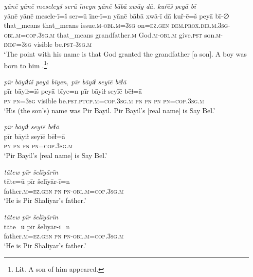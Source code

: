 \ea \label{BP.3}
\textit{yānē yānē meseleyš serū īneyn yānē bābā xwāy dā, kuřēš peyā bī} \\ 
\gll yānē yānē mesele-ī=š ser=ū īne-ī=n yānē bābā xwā-ī dā kuř-ē=š peyā bī-∅ \\ 
 that\_means that\_means issue\textsc{.m}\textsc{-obl}\textsc{.m}\textsc{=3sg} on\textsc{=ez.gen} \textsc{dem.prox}\textsc{.dir}\textsc{.m}\textsc{.3sg}\textsc{-obl}\textsc{.m}\textsc{=cop}\textsc{.3sg}\textsc{.m} that\_means grandfather\textsc{.m} God\textsc{.m}\textsc{-obl}\textsc{.m} give\textsc{.pst} son\textsc{.m}\textsc{-indf}\textsc{=3sg} visible be\textsc{.pst}\textsc{-3sg}\textsc{.m} \\ 
\glt `The point with his name is that God granted the grandfather [a son]. A boy  was born to him .\footnote{Lit. A son of him appeared.}'
\z 
 
\ea \label{BP.5}
\textit{pīr bāyiɫiš peyā bīyen, pīr bāyiɫ seyīē bēɫā} \\ 
\gll pīr bāyiɫ=iš peyā bīye=n pīr bāyiɫ seyīē bēɫ=ā \\ 
 \textsc{pn} \textsc{pn}\textsc{=3sg} visible be\textsc{.pst}\textsc{.ptcp}\textsc{.m}\textsc{=cop}\textsc{.3sg}\textsc{.m} \textsc{pn} \textsc{pn} \textsc{pn} \textsc{pn}\textsc{=cop}\textsc{.3sg}\textsc{.m} \\ 
\glt `His (the son’s) name was Pir Bayil. Pir Bayil’s [real name] is Say Bel.'
\z 
 
\ea \label{BP.6}
\textit{pīr bāyiɫ seyīē bēɫā} \\ 
\gll pīr bāyiɫ seyīē bēɫ=ā \\ 
 \textsc{pn} \textsc{pn} \textsc{pn} \textsc{pn}\textsc{=cop}\textsc{.3sg}\textsc{.m} \\ 
\glt `Pir Bayil’s [real name] is Say Bel.'
\z 
 
\ea \label{BP.7}
\textit{tātew pīr šelīyārīn} \\ 
\gll tāte=ū pīr šelīyār-ī=n \\ 
 father\textsc{.m}\textsc{=ez.gen} \textsc{pn} \textsc{pn}\textsc{-obl}\textsc{.m}\textsc{=cop}\textsc{.3sg}\textsc{.m} \\ 
\glt `He is Pir Shaliyar’s father.'
\z 
 
\ea \label{BP.8}
\textit{tātew pīr šelīyārīn} \\ 
\gll tāte=ū pīr šelīyār-ī=n \\ 
 father\textsc{.m}\textsc{=ez.gen} \textsc{pn} \textsc{pn}\textsc{-obl}\textsc{.m}\textsc{=cop}\textsc{.3sg}\textsc{.m} \\ 
\glt `He is Pir Shaliyar’s father.'
\z 
 

